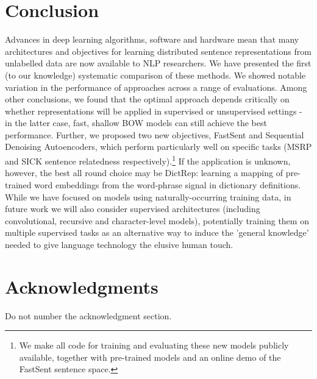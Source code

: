 \documentclass[11pt,letterpaper]{article}
\begin{document}
\section{Conclusion}
Advances in deep learning algorithms, software and hardware mean that many architectures and objectives for learning distributed sentence representations from unlabelled data are now available to NLP researchers. We have presented the first (to our knowledge) systematic comparison of these methods. We showed notable variation in the performance of approaches across a range of evaluations. Among other conclusions, we found that the optimal approach depends critically on whether representations will be applied in supervised or unsupervised settings - in the latter case, fast, shallow BOW models can still achieve the best performance. Further, we proposed two new objectives, FastSent and Sequential Denoising Autoencoders, which perform particularly well on specific tasks (MSRP and SICK sentence relatedness respectively).\footnote{We make all code for training and evaluating these new models publicly available, together with pre-trained models and an online demo of the FastSent sentence space.} If the application is unknown, however, the best all round choice may be DictRep: learning a mapping of pre-trained word embeddings from the word-phrase signal in dictionary definitions. While we have focused on models using naturally-occurring training data, in future work we will also consider supervised architectures (including convolutional, recursive and character-level models), potentially training them on multiple supervised tasks as an alternative way to induce the 'general knowledge' needed to give language technology the elusive human touch. 

\section*{Acknowledgments}

Do not number the acknowledgment section.



\end{document}
